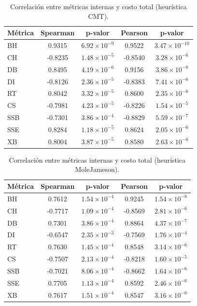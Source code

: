 \begin{table}[H]
\centering
\caption{Correlaci\'on entre m\'etricas internas y costo total (heur\'istica CMT).}
\label{tab:correlacion_cmt}
\small
\begin{tabular}{@{}lcccc@{}}
\toprule
\textbf{M\'etrica} & \textbf{Spearman} & \textbf{p-valor} & \textbf{Pearson} & \textbf{p-valor} \\
\midrule
BH & 0.9315 & $6.92\times10^{-9}$ & 0.9522 & $3.47\times10^{-10}$ \\
CH & -0.8235 & $1.48\times10^{-5}$ & -0.8540 & $3.28\times10^{-6}$ \\
DB & 0.8495 & $4.19\times10^{-6}$ & 0.9156 & $3.86\times10^{-8}$ \\
DI & -0.8126 & $2.36\times10^{-5}$ & -0.8383 & $7.41\times10^{-6}$ \\
RT & 0.8042 & $3.32\times10^{-5}$ & 0.8600 & $2.35\times10^{-6}$ \\
CS & -0.7981 & $4.23\times10^{-5}$ & -0.8226 & $1.54\times10^{-5}$ \\
SSB & -0.7301 & $3.86\times10^{-4}$ & -0.8829 & $5.59\times10^{-7}$ \\
SSE & 0.8284 & $1.18\times10^{-5}$ & 0.8624 & $2.05\times10^{-6}$ \\
XB & 0.8004 & $3.87\times10^{-5}$ & 0.8580 & $2.63\times10^{-6}$ \\
\bottomrule
\end{tabular}
\end{table}

\begin{table}[H]
\centering
\caption{Correlaci\'on entre m\'etricas internas y costo total (heur\'istica MoleJameson).}
\label{tab:correlacion_molejameson}
\small
\begin{tabular}{@{}lcccc@{}}
\toprule
\textbf{M\'etrica} & \textbf{Spearman} & \textbf{p-valor} & \textbf{Pearson} & \textbf{p-valor} \\
\midrule
BH & 0.7612 & $1.54\times10^{-4}$ & 0.9245 & $1.54\times10^{-8}$ \\
CH & -0.7717 & $1.09\times10^{-4}$ & -0.8569 & $2.81\times10^{-6}$ \\
DB & 0.7301 & $3.86\times10^{-4}$ & 0.8864 & $4.37\times10^{-7}$ \\
DI & -0.6547 & $2.35\times10^{-3}$ & -0.7569 & $1.76\times10^{-4}$ \\
RT & 0.7630 & $1.45\times10^{-4}$ & 0.8548 & $3.14\times10^{-6}$ \\
CS & -0.7507 & $2.13\times10^{-4}$ & -0.8218 & $1.60\times10^{-5}$ \\
SSB & -0.7021 & $8.06\times10^{-4}$ & -0.8662 & $1.64\times10^{-6}$ \\
SSE & 0.7705 & $1.13\times10^{-4}$ & 0.8592 & $2.46\times10^{-6}$ \\
XB & 0.7617 & $1.51\times10^{-4}$ & 0.8547 & $3.16\times10^{-6}$ \\
\bottomrule
\end{tabular}
\end{table}


